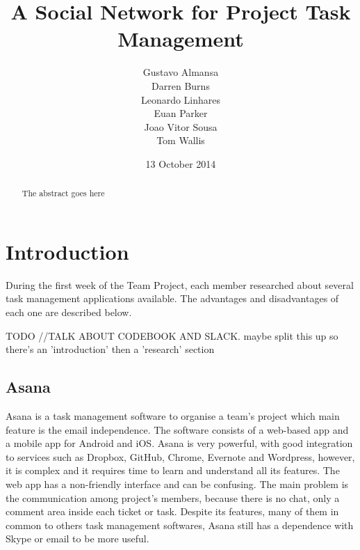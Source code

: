 \documentclass[a4paper]{l3proj}
\begin{document}
\title{A Social Network for Project Task Management}
\author{Gustavo Almansa\\
        Darren Burns \\
        Leonardo Linhares \\
        Euan Parker \\
        Joao Vitor Sousa \\
	Tom Wallis \\
}
\date{13 October 2014}
\maketitle
\begin{abstract}

The abstract goes here

\end{abstract}
\educationalconsent
\tableofcontents
\chapter{Introduction}
\label{intro}

During the first week of the Team Project, each member researched about several
task management applications available. The advantages and disadvantages of each
one are described below.

TODO
//TALK ABOUT CODEBOOK AND SLACK.  maybe split this up so there's an 'introduction' then a 'research' section



\section{Asana}
\label{asana}

Asana is a task management software to organise a team's project which main
feature is the email independence. The software consists of a web-based app and
a mobile app for Android and iOS. Asana is very powerful, with good integration
to services such as Dropbox, GitHub, Chrome, Evernote and Wordpress, however, it
is complex and it requires time to learn and understand all its features. The
web app has a non-friendly interface and can be confusing. The main problem is
the communication among project's members, because there is no chat, only a
comment area inside each ticket or task. Despite its features, many of them in
common to others task management softwares, Asana still has a dependence with
Skype or email to be more useful.
\end{document}
